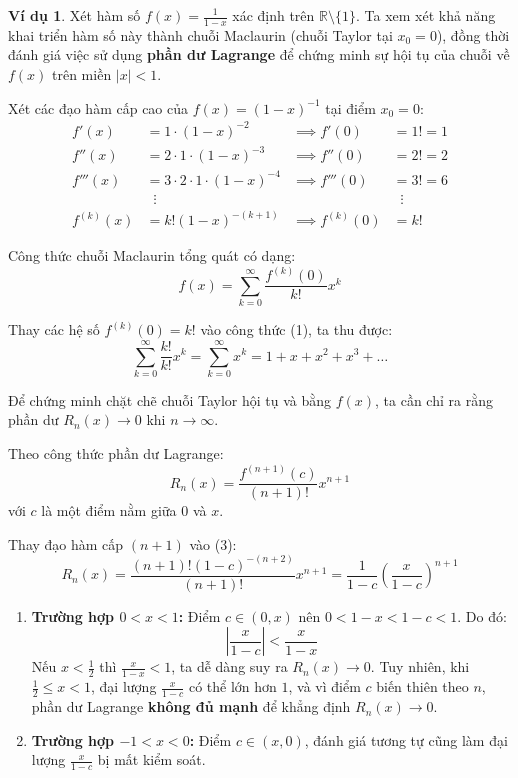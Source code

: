 \documentclass[12pt]{article}
\theoremstyle{definition}
\newtheorem*{example}{Ví dụ}
\theoremstyle{remark}
\begin{document}
\begin{example}
Xét hàm số $f(x) = \frac{1}{1-x}$ xác định trên $\mathbb{R} \setminus \{1\}$. Ta xem xét khả năng khai triển hàm số này thành chuỗi Maclaurin (chuỗi Taylor tại $x_0 = 0$), đồng thời đánh giá việc sử dụng \textbf{phần dư Lagrange} để chứng minh sự hội tụ của chuỗi về $f(x)$ trên miền $|x| < 1$.

Xét các đạo hàm cấp cao của $f(x) = (1-x)^{-1}$ tại điểm $x_0 = 0$:
\begin{align*}
f'(x) &= 1 \cdot (1-x)^{-2} &\implies f'(0) &= 1! = 1 \\
f''(x) &= 2 \cdot 1 \cdot (1-x)^{-3} &\implies f''(0) &= 2! = 2 \\
f'''(x) &= 3 \cdot 2 \cdot 1 \cdot (1-x)^{-4} &\implies f'''(0) &= 3! = 6 \\
&\;\;\vdots &&\;\;\vdots \\
f^{(k)}(x) &= k! (1-x)^{-(k+1)} &\implies f^{(k)}(0) &= k!
\end{align*}

Công thức chuỗi Maclaurin tổng quát có dạng:
\begin{equation}
f(x) = \sum_{k=0}^{\infty} \frac{f^{(k)}(0)}{k!} x^k
\end{equation}

Thay các hệ số $f^{(k)}(0) = k!$ vào công thức (1), ta thu được:
\begin{equation}
\sum_{k=0}^{\infty} \frac{k!}{k!} x^k = \sum_{k=0}^{\infty} x^k = 1 + x + x^2 + x^3 + \dots
\end{equation}


Để chứng minh chặt chẽ chuỗi Taylor hội tụ và bằng $f(x)$, ta cần chỉ ra rằng phần dư $R_n(x) \to 0$ khi $n \to \infty$. 

Theo công thức phần dư Lagrange:
\begin{equation}
R_n(x) = \frac{f^{(n+1)}(c)}{(n+1)!} x^{n+1}
\end{equation}
với $c$ là một điểm nằm giữa $0$ và $x$.

Thay đạo hàm cấp $(n+1)$ vào (3):
\begin{equation}
R_n(x) = \frac{(n+1)! (1-c)^{-(n+2)}}{(n+1)!} x^{n+1} = \frac{1}{1-c} \left( \frac{x}{1-c} \right)^{n+1}
\end{equation}


\begin{enumerate}
    \item \textbf{Trường hợp $0 < x < 1$:} Điểm $c \in (0, x)$ nên $0 < 1-x < 1-c < 1$. Do đó:
    \[
    \left| \frac{x}{1-c} \right| < \frac{x}{1-x}
    \]
    Nếu $x < \frac{1}{2}$ thì $\frac{x}{1-x} < 1$, ta dễ dàng suy ra $R_n(x) \to 0$. Tuy nhiên, khi $\frac{1}{2} \le x < 1$, đại lượng $\frac{x}{1-c}$ có thể lớn hơn $1$, và vì điểm $c$ biến thiên theo $n$, phần dư Lagrange \textbf{không đủ mạnh} để khẳng định $R_n(x) \to 0$.
    \item \textbf{Trường hợp $-1 < x < 0$:} Điểm $c \in (x, 0)$, đánh giá tương tự cũng làm đại lượng $\frac{x}{1-c}$ bị mất kiểm soát.
\end{enumerate}


\end{example}
\end{document}
